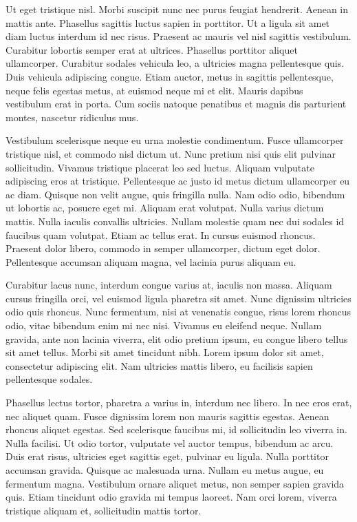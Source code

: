 \documentclass[a4paper]{article}
\begin{document}
Ut eget tristique nisl. Morbi suscipit nunc nec purus feugiat hendrerit. Aenean in mattis ante. Phasellus sagittis luctus sapien in porttitor. Ut a ligula sit amet diam luctus interdum id nec risus. Praesent ac mauris vel nisl sagittis vestibulum. Curabitur lobortis semper erat at ultrices. Phasellus porttitor aliquet ullamcorper. Curabitur sodales vehicula leo, a ultricies magna pellentesque quis. Duis vehicula adipiscing congue. Etiam auctor, metus in sagittis pellentesque, neque felis egestas metus, at euismod neque mi et elit. Mauris dapibus vestibulum erat in porta. Cum sociis natoque penatibus et magnis dis parturient montes, nascetur ridiculus mus.

Vestibulum scelerisque neque eu urna molestie condimentum. Fusce ullamcorper tristique nisl, et commodo nisl dictum ut. Nunc pretium nisi quis elit pulvinar sollicitudin. Vivamus tristique placerat leo sed luctus. Aliquam vulputate adipiscing eros at tristique. Pellentesque ac justo id metus dictum ullamcorper eu ac diam. Quisque non velit augue, quis fringilla nulla. Nam odio odio, bibendum ut lobortis ac, posuere eget mi. Aliquam erat volutpat. Nulla varius dictum mattis. Nulla iaculis convallis ultricies. Nullam molestie quam nec dui sodales id faucibus quam volutpat. Etiam ac tellus erat. In cursus euismod rhoncus. Praesent dolor libero, commodo in semper ullamcorper, dictum eget dolor. Pellentesque accumsan aliquam magna, vel lacinia purus aliquam eu.

Curabitur lacus nunc, interdum congue varius at, iaculis non massa. Aliquam cursus fringilla orci, vel euismod ligula pharetra sit amet. Nunc dignissim ultricies odio quis rhoncus. Nunc fermentum, nisi at venenatis congue, risus lorem rhoncus odio, vitae bibendum enim mi nec nisi. Vivamus eu eleifend neque. Nullam gravida, ante non lacinia viverra, elit odio pretium ipsum, eu congue libero tellus sit amet tellus. Morbi sit amet tincidunt nibh. Lorem ipsum dolor sit amet, consectetur adipiscing elit. Nam ultricies mattis libero, eu facilisis sapien pellentesque sodales.

Phasellus lectus tortor, pharetra a varius in, interdum nec libero. In nec eros erat, nec aliquet quam. Fusce dignissim lorem non mauris sagittis egestas. Aenean rhoncus aliquet egestas. Sed scelerisque faucibus mi, id sollicitudin leo viverra in. Nulla facilisi. Ut odio tortor, vulputate vel auctor tempus, bibendum ac arcu. Duis erat risus, ultricies eget sagittis eget, pulvinar eu ligula. Nulla porttitor accumsan gravida. Quisque ac malesuada urna. Nullam eu metus augue, eu fermentum magna. Vestibulum ornare aliquet metus, non semper sapien gravida quis. Etiam tincidunt odio gravida mi tempus laoreet. Nam orci lorem, viverra tristique aliquam et, sollicitudin mattis tortor.
\end{document}
